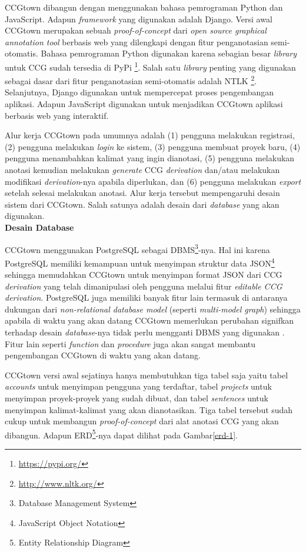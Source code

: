 CCGtown dibangun dengan menggunakan bahasa pemrograman Python dan JavaScript.
Adapun \textit{framework} yang digunakan adalah Django.
Versi awal CCGtown merupakan sebuah \textit{proof-of-concept} dari
\textit{open source graphical annotation tool} berbasis web yang dilengkapi dengan fitur
penganotasian semi-otomatis.
Bahasa pemrograman Python digunakan karena sebagian besar \textit{library} untuk CCG
sudah tersedia di PyPi \footnote{\url{https://pypi.org/}}.
Salah satu \textit{library} penting yang digunakan sebagai dasar dari fitur penganotasian
semi-otomatis adalah NTLK \footnote{\url{http://www.nltk.org/}}.
Selanjutnya, Django digunakan untuk mempercepat proses pengembangan aplikasi.
Adapun JavaScript digunakan untuk menjadikan CCGtown aplikasi berbasis web yang interaktif.

Alur kerja CCGtown pada umumnya adalah (1) pengguna melakukan registrasi, (2) pengguna
melakukan \textit{login} ke sistem, (3) pengguna membuat proyek baru, (4) pengguna
menambahkan kalimat yang ingin dianotasi, (5) pengguna melakukan anotasi kemudian melakukan
\textit{generate} CCG \textit{derivation} dan/atau melakukan modifikasi
\textit{derivation}-nya apabila diperlukan, dan (6) pengguna melakukan \textit{export}
setelah selesai melakukan anotasi. Alur kerja tersebut mempengaruhi desain sistem dari
CCGtown. Salah satunya adalah desain dari \textit{database} yang akan digunakan.
\\


\noindent\textbf{Desain Database}

CCGtown menggunakan PostgreSQL sebagai
DBMS\footnote{Database Management System}-nya.
Hal ini karena PostgreSQL memiliki kemampuan untuk menyimpan struktur data
JSON\footnote{JavaScript Object Notation} sehingga memudahkan CCGtown untuk menyimpan
format JSON dari CCG \textit{derivation} yang telah dimanipulasi oleh pengguna melalui
fitur \textit{editable CCG derivation}.
PostgreSQL juga memiliki banyak fitur lain termasuk di antaranya dukungan
dari \textit{non-relational database model} (seperti \textit{multi-model graph})
sehingga apabila di waktu yang akan datang CCGtown memerlukan perubahan signifkan
terhadap desain \textit{database}-nya tidak perlu mengganti DBMS yang digunakan
\citep{schonig2018mastering}.
Fitur lain seperti \textit{function} dan \textit{procedure} juga akan sangat membantu
pengembangan CCGtown di waktu yang akan datang.

CCGtown versi awal sejatinya hanya membutuhkan tiga tabel saja yaitu tabel
\textit{accounts} untuk menyimpan pengguna yang terdaftar, tabel
\textit{projects} untuk menyimpan proyek-proyek yang sudah dibuat, dan tabel
\textit{sentences} untuk menyimpan kalimat-kalimat yang akan dianotasikan.
Tiga tabel tersebut sudah cukup untuk membangun \textit{proof-of-concept} dari
alat anotasi CCG yang akan dibangun. Adapun
ERD\footnote{Entity Relationship Diagram}-nya dapat dilihat pada Gambar\ref{erd-1}.

